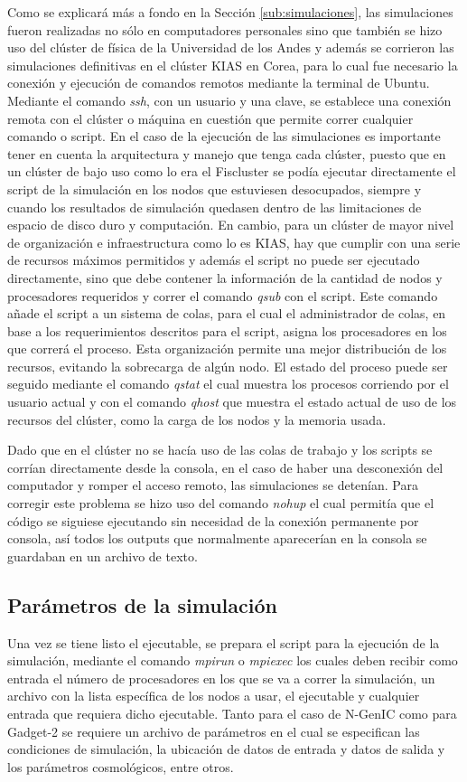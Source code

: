 Como se explicará más a fondo en la Sección \ref{sub:simulaciones}, las simulaciones fueron realizadas no sólo en computadores personales sino que también se hizo uso del clúster de física de la Universidad de los Andes y además se corrieron las simulaciones definitivas en el clúster KIAS en Corea, para lo cual fue necesario la conexión y ejecución de comandos remotos mediante la terminal de Ubuntu. Mediante el comando \textit{ssh}, con un usuario y una clave, se establece una conexión remota con el clúster o máquina en cuestión que permite correr cualquier comando o script. En el caso de la ejecución de las simulaciones es importante tener en cuenta la arquitectura y manejo que tenga cada clúster, puesto que en un clúster de bajo uso como lo era el Fiscluster se podía ejecutar directamente el script de la simulación en los nodos que estuviesen desocupados, siempre y cuando los resultados de simulación quedasen dentro de las limitaciones de espacio de disco duro y computación. En cambio, para un clúster de mayor nivel de organización e infraestructura como lo es KIAS, hay que cumplir con una serie de recursos máximos permitidos y además el script no puede ser ejecutado directamente, sino que debe contener la información de la cantidad de nodos y procesadores requeridos y correr el comando \textit{qsub} con el script. Este comando añade el script a un sistema de colas, para el cual el administrador de colas, en base a los requerimientos descritos para el script, asigna los procesadores en los que correrá el proceso. Esta organización permite una mejor distribución de los recursos, evitando la sobrecarga de algún nodo. El estado del proceso puede ser seguido mediante el comando \textit{qstat} el cual muestra los procesos corriendo por el usuario actual y con el comando \textit{qhost} que muestra el estado actual de uso de los recursos del clúster, como la carga de los nodos y la memoria usada. 

Dado que en el clúster no se hacía uso de las colas de trabajo y los scripts se corrían directamente desde la consola, en el caso de haber una desconexión del computador y romper el acceso remoto, las simulaciones se detenían. Para corregir este problema se hizo uso del comando \textit{nohup} el cual permitía que el código se siguiese ejecutando sin necesidad de la conexión permanente por consola, así todos los outputs que normalmente aparecerían en la consola se guardaban en un archivo de texto.

\subsection{Parámetros de la simulación}
Una vez se tiene listo el ejecutable, se prepara el script para la ejecución de la simulación, mediante el comando \textit{mpirun} o \textit{mpiexec} los cuales deben recibir como entrada el número de procesadores en los que se va a correr la simulación, un archivo con la lista específica de los nodos a usar, el ejecutable y cualquier entrada que requiera dicho ejecutable. Tanto para el caso de N-GenIC como para Gadget-2 se requiere un archivo de parámetros en el cual se especifican las condiciones de simulación, la ubicación de datos de entrada y datos de salida y los parámetros cosmológicos, entre otros. 

